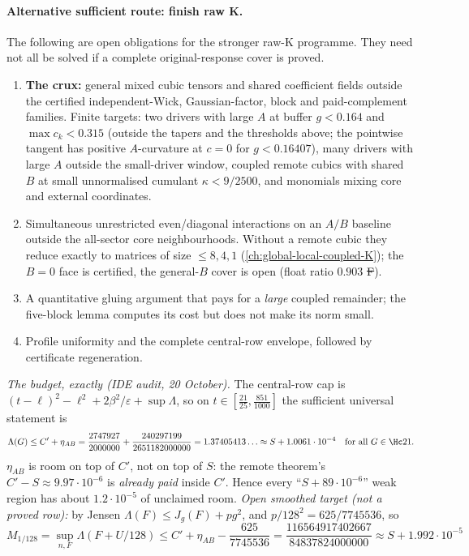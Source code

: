 \paragraph{Alternative sufficient route: finish raw K.}
The following are open obligations for the stronger raw-K programme. They
need not all be solved if a complete original-response cover is proved.

\begin{enumerate}
\item \textbf{The crux:} general mixed cubic tensors and shared coefficient fields outside the certified independent-Wick, Gaussian-factor, block and paid-complement
families. Finite targets: two drivers with large $A$ at buffer $g<0.164$ and $\max c_k<0.315$ (outside the tapers and the thresholds above; the
pointwise tangent has positive $A$-curvature at $c=0$ for $g<0.16407$), many drivers with large $A$ outside the small-driver window, coupled remote cubics with shared $B$ at small
unnormalised cumulant $\kappa<9/2500$, and monomials mixing core and external coordinates.
\item Simultaneous unrestricted even/diagonal interactions on an $A/B$ baseline outside the all-sector core neighbourhoods. Without a remote cubic they reduce exactly
to matrices of size $\le8,4,1$ (\autoref{ch:global-local-coupled-K}); the $B=0$ face is certified, the general-$B$ cover is open (float ratio $0.903$ \st{F}).
\item A quantitative gluing argument that pays for a \emph{large} coupled remainder; the five-block lemma computes its cost but does not make its norm small.
\item Profile uniformity and the complete central-row envelope, followed by certificate regeneration.
\end{enumerate}
\emph{The budget, exactly (IDE audit, 20 October).} The central-row cap is $(t-\ell)^2-\ell^2+2\beta^2/\varepsilon+\sup\Lambda$, so on $t\in[\frac{21}{25},\frac{851}{1000}]$ the
sufficient universal statement is
\[
 \Lambda(G)\le C'+\eta_{AB}=\frac{2747927}{2000000}+\frac{240297199}{2651182000000}=1.37405413\ldots\approx S+1.0061\cdot10^{-4}\quad\text{for all }G\in\Hc21 .
\]
$\eta_{AB}$ is room on top of $C'$, not on top of $S$: the remote theorem's $C'-S\approx9.97\cdot10^{-6}$ is \emph{already paid} inside $C'$. Hence every ``$S+89\cdot10^{-6}$'' weak region
has about $1.2\cdot10^{-5}$ of unclaimed room. \emph{Open smoothed target (not a proved row):} by Jensen $\Lambda(F)\le J_g(F)+pg^2$, and $p/128^2=625/7745536$, so
\[
 M_{1/128}=\sup_{n,F}\Lambda(F+U/128)\le C'+\eta_{AB}-\frac{625}{7745536}=\frac{116564917402667}{84837824000000}\approx S+1.992\cdot10^{-5}
\]
